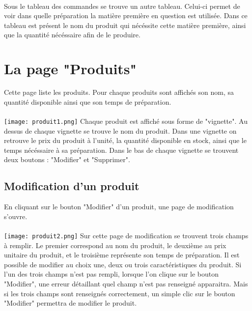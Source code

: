 \paragraph{}
Sous le tableau des commandes se trouve un autre tableau. Celui-ci permet de 
voir dans quelle préparation la matière première en question est utilisée. Dans 
ce tableau est présent le nom du produit qui nécéssite cette matière première, 
ainsi que la quantité nécéssaire afin de le produire.



\section{La page "Produits"}
Cette page liste les produits. Pour chaque produits sont affichés son nom, sa 
quantité disponible ainsi que son temps de préparation.

\paragraph{}
\texttt{[image: produit1.png]}
Chaque produit est affiché sous forme de "vignette". Au dessus de chaque 
vignette se trouve le nom du produit. Dans une vignette on retrouve le prix du 
produit à l'unité, la quantité disponible en stock, ainsi que le temps nécéssaire 
à sa préparation. Dans le bas de chaque vignette se trouvent deux boutons : 
"Modifier" et "Supprimer".

\subsection{Modification d'un produit}
En cliquant sur le bouton "Modifier" d'un produit, une page de modification 
s'ouvre. 

\paragraph{}
\texttt{[image: produit2.png]}
Sur cette page de modification se trouvent trois champs à remplir. 
Le premier correspond au nom du produit, le deuxième au prix unitaire du produit, 
et le troisième représente son temps de préparation. Il est possible de modifier 
au choix une, deux ou trois caractéristiques du produit. Si l'un des trois champs 
n'est pas rempli, lorsque l'on clique sur le bouton "Modifier", une erreur 
détaillant quel champ n'est pas renseigné apparaitra. Mais si les trois champs 
sont renseignés correctement, un simple clic sur le bouton "Modifier" permettra 
de modifier le produit.

